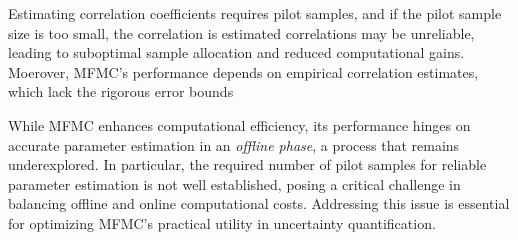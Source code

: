 Estimating correlation coefficients requires pilot samples, and if the pilot sample size is too small, the correlation is estimated correlations may be unreliable, leading to suboptimal sample allocation and reduced computational gains. Moerover, MFMC’s performance depends on empirical correlation estimates, which lack the rigorous error bounds



While MFMC enhances computational efficiency, its performance hinges on accurate parameter estimation in an \textit{offline phase}, a process that remains underexplored. In particular, the required number of pilot samples for reliable parameter estimation is not well established, posing a critical challenge in balancing offline and online computational costs. Addressing this issue is essential for optimizing MFMC’s practical utility in uncertainty quantification.


